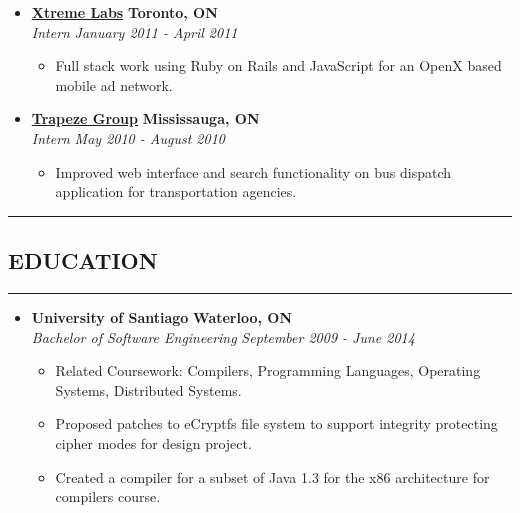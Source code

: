 \documentclass[10pt,letterpaper]{article}
\newcommand{\sectionTitle}[1]{
  \hrule
  \vspace{-1.0em} 
  \subsection*{\uppercase{\textbf{#1}}}
  \vspace{-0.3em}
    \hrule
    \vspace{0.5em}  
}
\begin{document}
\begin{itemize}[leftmargin=*]
    \item[]
    {\href{http://www.xtremelabs.com/}{\textbf{Xtreme Labs}} \hfill
      \textbf{Toronto, ON}}
    \\
    {\emph{Intern} \hfill \emph{January 2011 - April 2011}}
    
    \begin{itemize}[label=\textbullet]
      \itemsep0em
      \item Full stack work using Ruby on Rails and JavaScript for an OpenX
      based mobile ad network.
    \end{itemize}
    
    \item[]
    {\href{http://www.trapezegroup.com/}{\textbf{Trapeze Group}} \hfill
      \textbf{Mississauga, ON}}
    \\
    {\emph{Intern} \hfill \emph{May 2010 - August 2010}}
    
    \begin{itemize}[label=\textbullet]
      \itemsep0em
      \item Improved web interface and search functionality on bus dispatch
      application for transportation agencies.
    \end{itemize}
  \end{itemize}
  
  
    
  \sectionTitle{Education}
  
  \begin{itemize}[leftmargin=*]
    \parskip=-0.5em
    
    \item[]
    {\textbf{University of Santiago} \hfill
      \textbf{Waterloo, ON}
    }
    \\
    {\emph{Bachelor of Software Engineering} \hfill
      \emph{September 2009 - June 2014}}
    
    \begin{itemize}[label=\textbullet]
      \item Related Coursework: Compilers, Programming Languages, Operating
      Systems, Distributed Systems.
      \item Proposed patches to eCryptfs file system to support
      integrity protecting cipher modes for design project.
      \item Created a compiler for a subset of Java 1.3 for the
      x86 architecture for compilers course.
    \end{itemize}
  \end{itemize}
  
\end{document}

